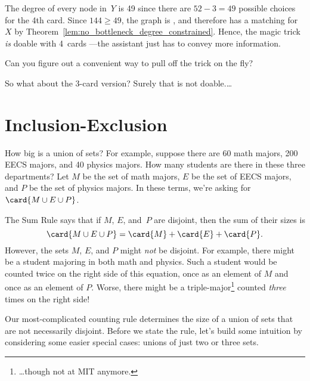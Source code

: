 \begin{editingnotes}
The degree of every node in~$Y$ is 49 since there are $52 - 3 = 49$
possible choices for the 4th card.  Since $144 \ge 49$, the graph is
, and therefore has a matching for~$X$ by
Theorem~\ref{lem:no_bottleneck_degree_constrained}.
Hence, the magic trick \emph{is} doable with 4~cards ---the assistant
just has to convey more information.  


Can you figure out a convenient
way to pull off the trick on the fly?

So what about the 3-card version?  Surely that is not doable.\dots
\end{editingnotes}


\begin{problems}
\classproblems
{}

\homeworkproblems
{}

\end{problems}



\section{Inclusion-Exclusion}\label{inc-ex_sec}

How big is a union of sets?  For example, suppose there are 60 math
majors, 200 EECS majors, and 40 physics majors.  How many students are
there in these three departments?  Let $M$ be the set of math majors,
$E$ be the set of EECS majors, and $P$ be the set of physics majors.  In
these terms, we're asking for $\card{M \cup E \cup P}$.

The Sum Rule says that if $M$, $E$, and~$P$ are disjoint, then the sum
of their sizes is
%
\[
\card{M \cup E \cup P} = \card{M} + \card{E} + \card{P} .
\]
%
However, the sets $M$, $E$, and $P$ might \emph{not} be disjoint.  For
example, there might be a student majoring in both math and
physics.  Such a student would be counted twice on the right side of this
equation, once as an element of $M$ and once as an element of $P$.  Worse,
there might be a triple-major\footnote{\dots though not at MIT anymore.}
counted \emph{three} times on the right side!

Our most-complicated counting rule determines the size of a union of
sets that are not necessarily disjoint.  Before we state the rule,
let's build some intuition by considering some easier special cases:
unions of just two or three sets.

